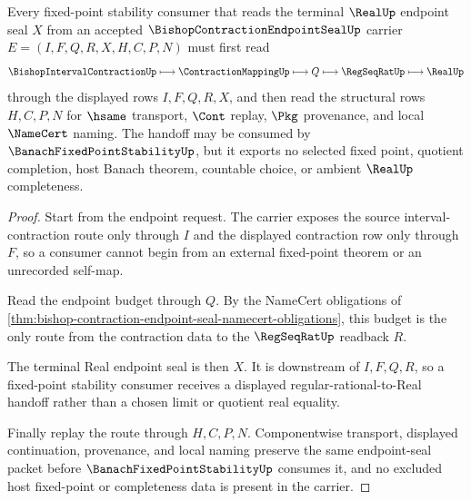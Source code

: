 \begin{theorem}
\label{thm:bishop-contraction-endpoint-seal-real-handoff}
Every fixed-point stability consumer that reads the terminal $\RealUp$ endpoint seal $X$ from an accepted $\BishopContractionEndpointSealUp$ carrier $E=(I,F,Q,R,X,H,C,P,N)$ must first read
$$
\BishopIntervalContractionUp \longmapsto \ContractionMappingUp \longmapsto Q \longmapsto \RegSeqRatUp \longmapsto \RealUp
$$
through the displayed rows $I,F,Q,R,X$, and then read the structural rows $H,C,P,N$ for $\hsame$ transport, $\Cont$ replay, $\Pkg$ provenance, and local $\NameCert$ naming. The handoff may be consumed by $\BanachFixedPointStabilityUp$, but it exports no selected fixed point, quotient completion, host Banach theorem, countable choice, or ambient $\RealUp$ completeness.
\end{theorem}
\begin{proof}
Start from the endpoint request. The carrier exposes the source interval-contraction route only through $I$ and the displayed contraction row only through $F$, so a consumer cannot begin from an external fixed-point theorem or an unrecorded self-map.

Read the endpoint budget through $Q$. By the NameCert obligations of \autoref{thm:bishop-contraction-endpoint-seal-namecert-obligations}, this budget is the only route from the contraction data to the $\RegSeqRatUp$ readback $R$.

The terminal Real endpoint seal is then $X$. It is downstream of $I,F,Q,R$, so a fixed-point stability consumer receives a displayed regular-rational-to-Real handoff rather than a chosen limit or quotient real equality.

Finally replay the route through $H,C,P,N$. Componentwise transport, displayed continuation, provenance, and local naming preserve the same endpoint-seal packet before $\BanachFixedPointStabilityUp$ consumes it, and no excluded host fixed-point or completeness data is present in the carrier.
\end{proof}



